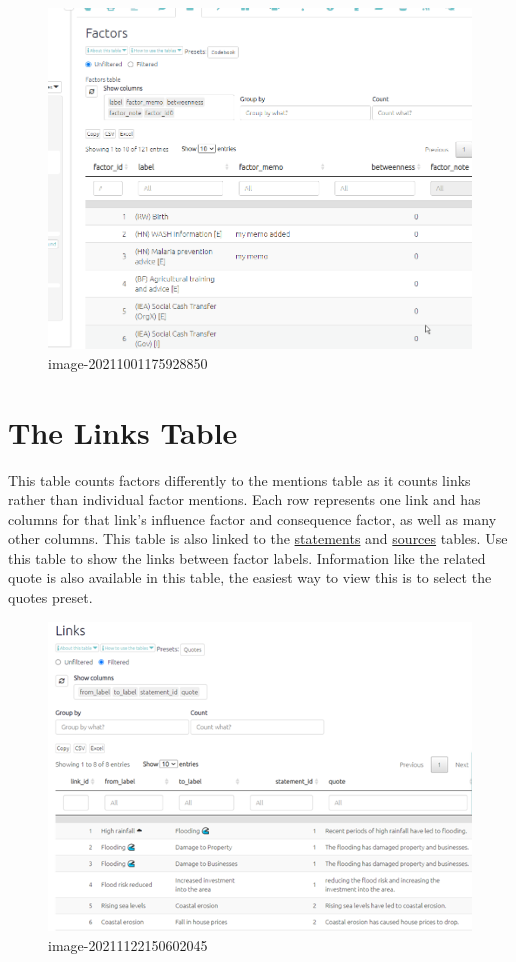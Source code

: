 \documentclass[
]{book}
\begin{document}
\begin{figure}
\centering
\includegraphics[width=6.77083in,height=\textheight]{_assets/factors-table.gif}
\caption{image-20211001175928850}
\end{figure}

\hypertarget{xthe-links-table}{%
\chapter{The Links Table}\label{xthe-links-table}}

This table counts factors differently to the mentions table as it counts links rather than individual factor mentions. Each row represents one link and has columns for that link's influence factor and consequence factor, as well as many other columns. This table is also linked to the \protect\hyperlink{xthe-statements-table}{statements} and \protect\hyperlink{xthe-sources-table}{sources} tables. Use this table to show the links between factor labels. Information like the related quote is also available in this table, the easiest way to view this is to select the quotes preset.

\begin{figure}
\centering
\includegraphics[width=6.77083in,height=\textheight]{_assets/image-20211122150602045.png}
\caption{image-20211122150602045}
\end{figure}
\end{document}
